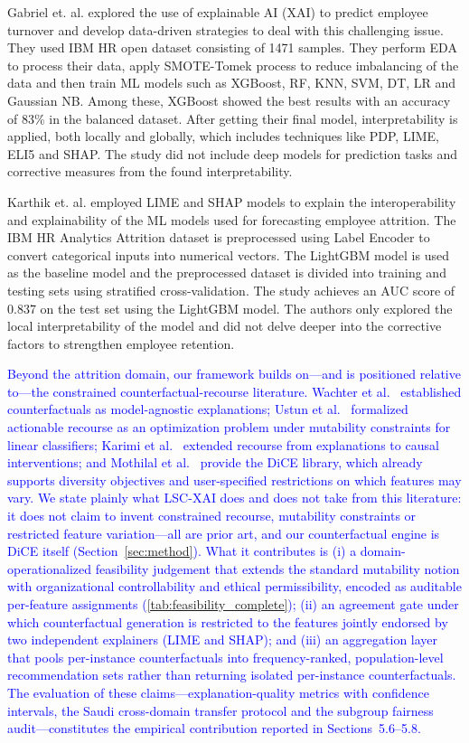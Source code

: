 \documentclass[a4paper,fleqn]{cas-sc}
\begin{document}
Gabriel et. al. \cite{Diaz2023} explored the use of explainable AI (XAI) to predict employee turnover and develop data-driven strategies to deal with this challenging issue. They used IBM HR open dataset consisting of 1471 samples. They perform EDA to process their data, apply SMOTE-Tomek process to reduce imbalancing of the data and then train ML models such as XGBoost, RF, KNN, SVM, DT, LR and Gaussian NB. Among these, XGBoost showed the best results with an accuracy of 83\% in the balanced dataset. After getting their final model, interpretability is applied, both locally and globally, which includes techniques like PDP, LIME, ELI5 and SHAP. The study did not include deep models for prediction tasks and corrective measures from the found interpretability.

Karthik et. al. \cite{Karthik2022} employed LIME and SHAP models to explain the interoperability and explainability of the ML models used for forecasting employee attrition. The IBM HR Analytics Attrition dataset is preprocessed using Label Encoder to convert categorical inputs into numerical vectors. The LightGBM model is used as the baseline model and the preprocessed dataset is divided into training and testing sets using stratified cross-validation. The study achieves an AUC score of 0.837 on the test set using the LightGBM model. The authors only explored the local interpretability of the model and did not delve deeper into the corrective factors to strengthen employee retention.

\textcolor{blue}{Beyond the attrition domain, our framework builds on---and is positioned relative to---the constrained counterfactual-recourse literature. Wachter et al.~\cite{wachter2017counterfactual} established counterfactuals as model-agnostic explanations; Ustun et al.~\cite{ustun2019actionable} formalized actionable recourse as an optimization problem under mutability constraints for linear classifiers; Karimi et al.~\cite{karimi2021algorithmic} extended recourse from explanations to causal interventions; and Mothilal et al.~\cite{mothilal2020dice} provide the DiCE library, which already supports diversity objectives and user-specified restrictions on which features may vary. We state plainly what LSC-XAI does and does not take from this literature: it does not claim to invent constrained recourse, mutability constraints or restricted feature variation---all are prior art, and our counterfactual engine is DiCE itself (Section~\ref{sec:method}). What it contributes is (i) a domain-operationalized feasibility judgement that extends the standard mutability notion with organizational controllability and ethical permissibility, encoded as auditable per-feature assignments (\cref{tab:feasibility_complete}); (ii) an agreement gate under which counterfactual generation is restricted to the features jointly endorsed by two independent explainers (LIME and SHAP); and (iii) an aggregation layer that pools per-instance counterfactuals into frequency-ranked, population-level recommendation sets rather than returning isolated per-instance counterfactuals. The evaluation of these claims---explanation-quality metrics with confidence intervals, the Saudi cross-domain transfer protocol and the subgroup fairness audit---constitutes the empirical contribution reported in Sections~5.6--5.8.}
\end{document}
